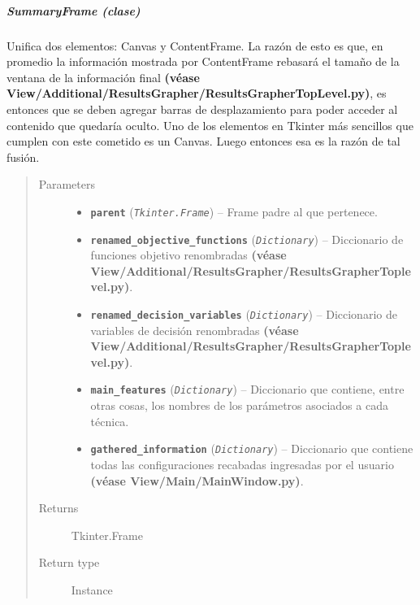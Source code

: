 \documentclass[class=report, crop=false]{standalone}
\begin{document}
\subparagraph{SummaryFrame (clase)}
\label{sec:a_3_3_3_1_2}
\begin{fulllineitems}

\begin{DUlineblock}{0em}
\item[] Unifica dos elementos: Canvas y ContentFrame.\break
La razón de esto es que, en promedio la información 
mostrada por ContentFrame rebasará el tamaño de la 
ventana de la información final \textbf{(véase View/Additional/}\break\textbf{ResultsGrapher/ResultsGrapherTopLevel.py)}, 
es entonces que se deben agregar barras de desplazamiento 
para poder acceder al contenido que quedaría oculto.\break
Uno de los elementos en Tkinter más sencillos que 
cumplen con este cometido es un Canvas. Luego entonces 
esa es la razón de tal fusión.
\end{DUlineblock}

\begin{quote}\begin{description}
\item[{Parameters}] \leavevmode\begin{itemize}
\item \textbf{\texttt{parent}} (\emph{\texttt{Tkinter.Frame}}) -- Frame padre al que pertenece.
\item \textbf{\texttt{renamed\_objective\_functions}} (\emph{\texttt{Dictionary}}) -- Diccionario de funciones objetivo renombradas \textbf{(véase View/Additional/ResultsGrapher/ResultsGrapherToplevel.py)}.
\item \textbf{\texttt{renamed\_decision\_variables}} (\emph{\texttt{Dictionary}}) -- Diccionario de variables de decisión renombradas  
\textbf{(véase View/Additional/ResultsGrapher/ResultsGrapherToplevel.py)}.
\item \textbf{\texttt{main\_features}} (\emph{\texttt{Dictionary}}) -- Diccionario que contiene, entre otras cosas, los nombres de los
parámetros asociados a cada técnica.
\item \textbf{\texttt{gathered\_information}} (\emph{\texttt{Dictionary}}) -- Diccionario que contiene todas las configuraciones 
recabadas ingresadas por el usuario \textbf{(véase View/Main/MainWindow.py)}.
\end{itemize}

\item[{Returns}] \leavevmode
Tkinter.Frame
\item[{Return type}] \leavevmode
Instance
\end{description}\end{quote}


\end{fulllineitems}
\end{document}
